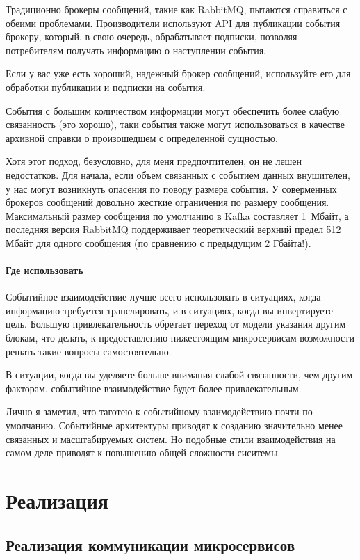 \documentclass[%
	11pt,
	a4paper,
	utf8,
		]{article}
\begin{document}
Традиционно брокеры сообщений, такие как RabbitMQ, пытаются справиться с обеими проблемами. Производители используют API для публикации события брокеру, который, в свою очередь, обрабатывает подписки, позволяя потребителям получать информацию о наступлении события.

Если у вас уже есть хороший, надежный брокер сообщений, используйте его для обработки публикации и подписки на события.

События с большим количеством информации могут обеспечить более слабую связанность (это хорошо), таки события также могут использоваться в качестве архивной справки о произошедшем с определенной сущностью.

Хотя этот подход, безусловно, для меня предпочтителен, он не лешен недостатков. Для начала, если объем связанных с событием данных внушителен, у нас могут возникнуть опасения по поводу размера события. У соверменных брокеров сообщений довольно жесткие ограничения по размеру сообщения. Максимальный размер сообщения по умолчанию в Kafka составляет 1~Мбайт, а последняя версия RabbitMQ поддерживает теоретический верхний предел 512 Мбайт для одного сообщения (по сравнению с предыдущим 2 Гбайта!). 

\paragraph{Где использовать}

Событийное взаимодействие лучше всего использовать в ситуациях, когда информацию требуется транслировать, и в ситуациях, когда вы инвертируете цель. Большую привлекательность обретает переход от модели указания другим блокам, что делать, к предоставлению нижестоящим микросервисам возможности решать такие вопросы самостоятельно.

В ситуации, когда вы уделяете больше внимания слабой связанности, чем другим факторам, событийное взаимодействие будет более привлекательным.

Лично я заметил, что таготею к событийному взаимодействию почти по умолчанию. Событийные архитектуры приводят к созданию значительно менее связанных и масштабируемых систем. Но подобные стили взаимодействия на самом деле приводят к повышению общей сложности сиситемы.

\section{Реализация}

\subsection{Реализация коммуникации микросервисов}
\end{document}
